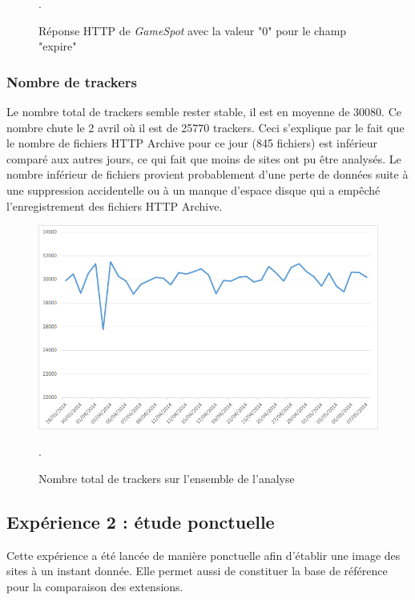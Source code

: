 \begin{figure}[h]
	\centering
	
	\caption{\label{bad_field_gamespot}Réponse HTTP de \textit{GameSpot} avec la valeur "0" pour le champ "expire"}.
\end{figure}

\subsubsection{Nombre de trackers}
Le nombre total de trackers semble rester stable, il est en moyenne de 30080. Ce nombre chute le 2 avril où il est de 25770 trackers. Ceci s'explique par le fait que le nombre de fichiers HTTP Archive pour ce jour (845 fichiers) est inférieur comparé aux autres jours, ce qui fait que moins de sites ont pu être analysés. Le nombre inférieur de fichiers provient probablement d'une perte de données suite à une suppression accidentelle ou à un manque d'espace disque qui a empêché l'enregistrement des fichiers HTTP Archive.

\begin{figure}[h]
	\centering
	\includegraphics[scale=.8]{graphiques/Exp1_parser_total_trackers.png}
	\caption{\label{Exp1_parser_total_trackers}Nombre total de trackers sur l'ensemble de l'analyse}.
\end{figure}
\subsection{Expérience 2 : étude ponctuelle}
Cette expérience a été lancée de manière ponctuelle afin d'établir une image des sites à un instant donnée. Elle permet aussi de constituer la base de référence pour la comparaison des extensions.
\newline

